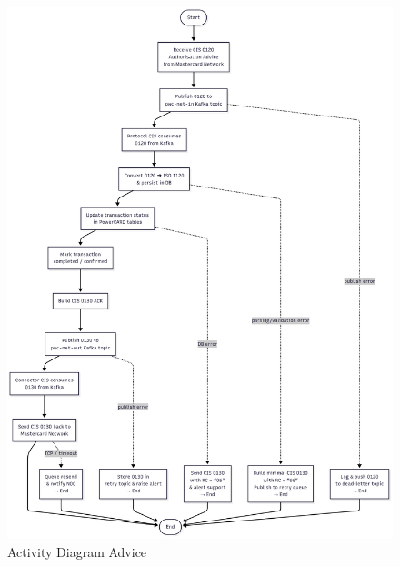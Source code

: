 \documentclass[12pt,a4paper]{report}
\begin{document}
\begin{figure}[H]
\centering
\includegraphics[width=\textwidth,height=0.85\textheight,keepaspectratio]{media/advice-auth-activity.png}
\caption{Activity Diagram Advice }
\label{fig:}
\end{figure}
\clearpage
\end{document}
